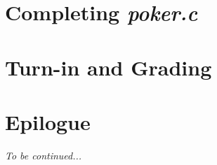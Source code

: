 \section{Completing \textit{poker.c}} \label{sec:completingpoker}   

\section{Turn-in and Grading}                                       

\section*{Epilogue}                                                 \GetHired

\textit{To be continued...}


